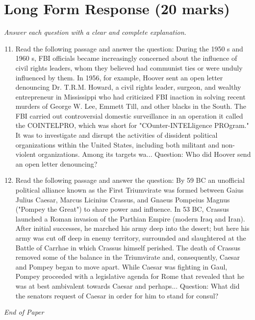 \documentclass[12pt]{article}
\begin{document}
\section*{Long Form Response (20 marks)}
\textit{Answer each question with a clear and complete explanation.}
\begin{enumerate}[label=\arabic*.]
\setcounter{enumi}{10}
\item Read the following passage and answer the question: During the 1950 s and 1960 s, FBI officials became increasingly concerned about the influence of civil rights leaders, whom they believed had communist ties or were unduly influenced by them. In 1956, for example, Hoover sent an open letter denouncing Dr. T.R.M. Howard, a civil rights leader, surgeon, and wealthy entrepreneur in Mississippi who had criticized FBI inaction in solving recent murders of George W. Lee, Emmett Till, and other blacks in the South. The FBI carried out controversial domestic surveillance in an operation it called the COINTELPRO, which was short for "COunter-INTELligence PROgram." It was to investigate and disrupt the activities of dissident political organizations within the United States, including both militant and non-violent organizations. Among its targets wa... Question: Who did Hoover send an open letter denouncing?
\item Read the following passage and answer the question: By 59 BC an unofficial political alliance known as the First Triumvirate was formed between Gaius Julius Caesar, Marcus Licinius Crassus, and Gnaeus Pompeius Magnus ("Pompey the Great") to share power and influence. In 53 BC, Crassus launched a Roman invasion of the Parthian Empire (modern Iraq and Iran). After initial successes, he marched his army deep into the desert; but here his army was cut off deep in enemy territory, surrounded and slaughtered at the Battle of Carrhae in which Crassus himself perished. The death of Crassus removed some of the balance in the Triumvirate and, consequently, Caesar and Pompey began to move apart. While Caesar was fighting in Gaul, Pompey proceeded with a legislative agenda for Rome that revealed that he was at best ambivalent towards Caesar and perhaps... Question: What did the senators request of Caesar in order for him to stand for consul?
\end{enumerate}

\vfill
\noindent\textit{End of Paper}
\end{document}
